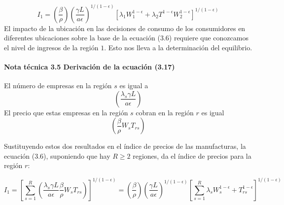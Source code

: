 \begin{equation}
    I_1 = \left(\dfrac{\beta}{\rho}\right) \left(\dfrac{\gamma L}{a\epsilon}\right)^{1/(1-\epsilon)} \left[\lambda_1 W_1^{1-\epsilon} + \lambda_2 T^{1-\epsilon} W_2^{1-\epsilon}\right]^{1/(1-\epsilon)}
\end{equation}
El impacto de la ubicación en las decisiones de consumo de los consumidores en diferentes ubicaciones sobre la base de la ecuación (3.6) requiere que conozcamos el nivel de ingresos de la región $1$. Esto nos lleva a la determinación del equilibrio.



\paragraph{Nota técnica 3.5 Derivación de la ecuación (3.17)}
El número de empresas en la región $s$ es igual a
$$\left(\dfrac{\lambda_s \gamma L}{a \epsilon}\right)$$
El precio que estas empresas en la región $s$ cobran en la región $r$ es igual
$$\left(\dfrac{\beta}{\rho} W_s T_{rs}\right)$$

Sustituyendo estos dos resultados en el índice de precios de las manufacturas, la ecuación (3.6), suponiendo que hay $R\geq 2$ regiones, da el índice de precios para la región $r$:

$$I_1 = \left[ \sum_{s=1}^R \left( \dfrac{\lambda_s \gamma L}{a\epsilon} \dfrac{\beta}{\rho} W_s T_{rs}\right)\right]^{1/(1-\epsilon)}=\left(\dfrac{\beta}{\rho}\right) \left(\dfrac{\gamma L}{a\epsilon}\right)^{1/(1-\epsilon)} \left[\sum_{s=1}^R \lambda_s W_s^{1-\epsilon} + T_{rs}^{1-\epsilon} \right]^{1/(1-\epsilon)}$$



